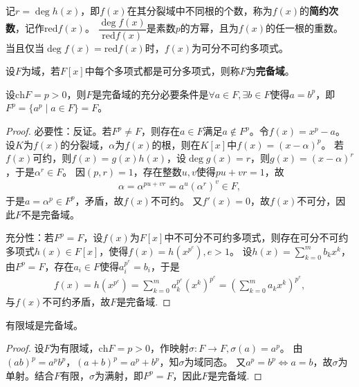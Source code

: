 \documentclass[../../main.tex]{subfiles}%
\begin{document}
\begin{remark}
记$r=\deg h(x)$，即$f(x)$在其分裂域中不同根的个数，称为$f(x)$的\textbf{简约次数}，记作$\mathrm{red}f(x)$。
$\dfrac{\deg f(x)}{\mathrm{red}f(x)}$是素数$p$的方幂，且为$f(x)$的任一根的重数。
当且仅当$\deg f(x)=\mathrm{red}f(x)$时，$f(x)$为可分不可约多项式。
\end{remark}

\begin{definition}
设$F$为域，若$F[x]$中每个多项式都是可分多项式，则称$F$为\textbf{完备域}。
\end{definition}

\begin{theorem}
设$\mathrm{ch}F=p>0$，则$F$是完备域的充分必要条件是$\forall a\in F,\exists b\in F$使得$a=b^p$，即$F^p=\{a^p\mid a\in F\}=F$。
\end{theorem}

\begin{proof}

必要性：反证。若$F^p\neq F$，则存在$a\in F$满足$a\notin F^p$。令$f(x)=x^p-a$。
设$K$为$f(x)$的分裂域，$\alpha$为$f(x)$的根，则在$K[x]$中$f(x)=(x-\alpha)^p$。
若$f(x)$可约，则$f(x)=g(x)h(x)$，设$\deg g(x)=r$，则$g(x)=(x-\alpha)^r$，于是$\alpha^r\in F$。
因$(p,r)=1$，存在整数$u,v$使得$pu+vr=1$，故
\begin{align*}
\alpha=\alpha^{pu+vr}=a^u(\alpha^r)^v\in F,
\end{align*}
于是$a=\alpha^p\in F^p$，矛盾，故$f(x)$不可约。
又$f'(x)=0$，故$f(x)$不可分，因此$F$不是完备域。

充分性：若$F^p=F$，设$f(x)$为$F[x]$中不可分不可约多项式，则存在可分不可约多项式$h(x)\in F[x]$，使得$f(x)=h(x^{p^e}),e>1$。
设$h(x)=\sum\limits_{k=0}^m b_kx^k$，由$F^p=F$，存在$a_i\in F$使得$a_i^{p^e}=b_i$，于是
\begin{align*}
f(x)=h(x^{p^e})=\sum\limits_{k=0}^m a_k^{p^e}(x^k)^{p^e}=\left(\sum\limits_{k=0}^m a_kx^k\right)^{p^e},
\end{align*}
与$f(x)$不可约矛盾，故$F$是完备域.

\end{proof}

\begin{corollary}
有限域是完备域。
\end{corollary}

\begin{proof}

设$F$为有限域，$\mathrm{ch}F=p>0$，作映射$\sigma:F\to F,\sigma(a)=a^p$。
由$(ab)^p=a^pb^p$，$(a+b)^p=a^p+b^p$，知$\sigma$为域同态。
又$a^p=b^p\iff a=b$，故$\sigma$为单射。结合$F$有限，$\sigma$为满射，即$F^p=F$，因此$F$是完备域.

\end{proof}
\end{document}
